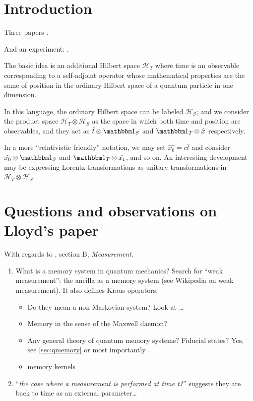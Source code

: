 \section{Introduction}

Three papers \cite{Lloyd:Time, Marletto:Evolution, Prvanovic}.

And an experiment: \cite{Moreva:synthetic,Moreva:illustration}.

The basic idea is an additional Hilbert space $\mathcal{H}_T$ where time is an observable
corresponding to
a self-adjoint operator whose mathematical properties are the same of position in the
ordinary Hilbert space of a quantum particle in one dimension.

In this language, the ordinary Hilbert space can be labeled $\mathcal{H}_S$;
and we consider the product space $\mathcal{H}_T \otimes \mathcal{H}_S$ as
the space in which both time and position are observables, and they act as
$\hat{t} \otimes \idop_S$ and $\idop_T \otimes \hat{x}$
respectively.

\begin{remark}
  In a more ``relativistic friendly'' notation, we may set
  $\hat{x_0} = c\hat{t}$ and consider
  $\hat{x_0} \otimes \idop_S$ and $\idop_T \otimes \hat{x_1}$,
  and so on. An interesting development may be expressing
  Lorentz transformations as unitary transformations in
  $\mathcal{H}_T \otimes \mathcal{H}_S$.
\end{remark}

\iftodo

\section{Questions and observations on Lloyd's paper}

With regards to \cite{Lloyd:Time}, section B, \textit{Measurement}.

\begin{enumerate}
  \item What is a memory system in quantum mechanics? Search for ``weak measurement'': the ancilla as a memory system (see Wikipedia on weak measurement). It also defines Kraus operators.
  \begin{itemize}
    \item Do they mean a non-Markovian system? Look at \cite{MeasurementMarkovian}\dots
    \item Memory in the sense of the Maxwell daemon?
    \item
      Any general theory of quantum memory systems? Fiducial states?
      Yes, see \ref{sec:qmemory} or most importantly \cite[Ch.~3]{PreskillNotes}.
    \item memory kernels \cite{CarmichaelOQS2017}
  \end{itemize}
  \item ``\emph{the case where a measurement is performed at time t1}'' suggests they are back to time as an external parameter\dots
\end{enumerate}

